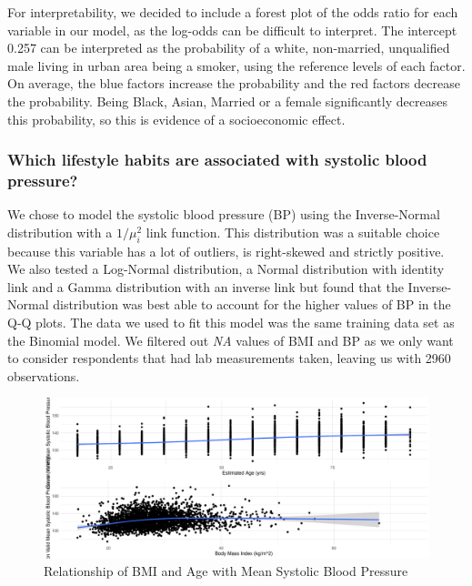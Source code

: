 \documentclass[
  11pt,
  twocolumn]{article}
\begin{document}
For interpretability, we decided to include a forest plot of the odds
ratio for each variable in our model, as the log-odds can be difficult
to interpret. The intercept 0.257 can be interpreted as the probability
of a white, non-married, unqualified male living in urban area being a
smoker, using the reference levels of each factor. On average, the blue
factors increase the probability and the red factors decrease the
probability. Being Black, Asian, Married or a female significantly
decreases this probability, so this is evidence of a socioeconomic
effect.

\hypertarget{which-lifestyle-habits-are-associated-with-systolic-blood-pressure}{%
\subsubsection{Which lifestyle habits are associated with systolic blood
pressure?}\label{which-lifestyle-habits-are-associated-with-systolic-blood-pressure}}

We chose to model the systolic blood pressure (BP) using the
Inverse-Normal distribution with a \(1/\mu_i^2\) link function. This
distribution was a suitable choice because this variable has a lot of
outliers, is right-skewed and strictly positive. We also tested a
Log-Normal distribution, a Normal distribution with identity link and a
Gamma distribution with an inverse link but found that the
Inverse-Normal distribution was best able to account for the higher
values of BP in the Q-Q plots. The data we used to fit this model was
the same training data set as the Binomial model. We filtered out
\emph{NA} values of BMI and BP as we only want to consider respondents
that had lab measurements taken, leaving us with 2960 observations.

\begin{figure}[H]
\includegraphics{Coursework_files/figure-latex/output-relationship-plots-1} \caption{Relationship of BMI and Age with Mean Systolic Blood Pressure}\label{fig:output-relationship-plots}
\end{figure}
\end{document}
